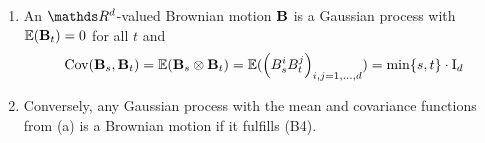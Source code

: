 \begin{thm}
\begin{enumerate}[label=(\alph*)]
\item An $\Rd$-valued Brownian motion $\mathbf{B}$
	is a Gaussian process
	with $\E{\B_t}=0$ for all $t$
	and
	\begin{align*}
		\Cov(\B_s, \B_t)
		= \E{\B_s\otimes\B_t}
		= \E{\left(B_s^iB_t^j\right)_{i,j=1,\dots,d}}
		= \min\{s,t\} \cdot \Id
	\end{align*}
\item Conversely, any Gaussian process
	with the mean and covariance functions from (a)
	is a Brownian motion if it fulfills (B4).
\qedhere
\end{enumerate}
\end{thm}

